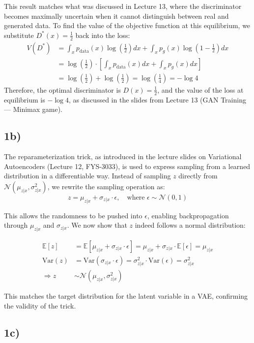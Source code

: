 \documentclass[10pt]{article}
\begin{document}
This result matches what was discussed in Lecture 13, where the discriminator becomes maximally uncertain when it cannot distinguish between real and generated data.
\medskip
To find the value of the objective function at this equilibrium, we substitute \( D^*(x) = \frac{1}{2} \) back into the loss:
\begin{align*}
V(D^*) &= \int_x p_{\text{data}}(x) \log \left( \frac{1}{2} \right) dx + \int_x p_g(x) \log \left( 1 - \frac{1}{2} \right) dx \\
&= \log \left( \frac{1}{2} \right) \cdot \left[ \int_x p_{\text{data}}(x) dx + \int_x p_g(x) dx \right] \\
&= \log \left( \frac{1}{2} \right) + \log \left( \frac{1}{2} \right) = \log \left( \frac{1}{4} \right) = -\log 4
\end{align*}
Therefore, the optimal discriminator is \( \boxed{D(x) = \frac{1}{2}} \), and the value of the loss at equilibrium is \( \boxed{-\log 4} \), as discussed in the slides from Lecture 13 (GAN Training — Minimax game).
\subsection*{1b)}
The reparameterization trick, as introduced in the lecture slides on Variational Autoencoders (Lecture 12, FYS-3033), is used to express sampling from a learned distribution in a differentiable way. Instead of sampling $z$ directly from $\mathcal{N}(\mu_{z|x}, \sigma_{z|x}^2)$, we rewrite the sampling operation as:
\[
z = \mu_{z|x} + \sigma_{z|x} \cdot \epsilon, \quad \text{where } \epsilon \sim \mathcal{N}(0, 1)
\]

\noindent This allows the randomness to be pushed into $\epsilon$, enabling backpropagation through $\mu_{z|x}$ and $\sigma_{z|x}$. We now show that $z$ indeed follows a normal distribution:

\begin{align*}
\mathbb{E}[z] &= \mathbb{E}[\mu_{z|x} + \sigma_{z|x} \cdot \epsilon] = \mu_{z|x} + \sigma_{z|x} \cdot \mathbb{E}[\epsilon] = \mu_{z|x} \\
\text{Var}(z) &= \text{Var}(\sigma_{z|x} \cdot \epsilon) = \sigma_{z|x}^2 \cdot \text{Var}(\epsilon) = \sigma_{z|x}^2 \\
\Rightarrow z &\sim \mathcal{N}(\mu_{z|x}, \sigma_{z|x}^2)
\end{align*}

\noindent This matches the target distribution for the latent variable in a VAE, confirming the validity of the trick.
\subsection*{1c)}
\end{document}
